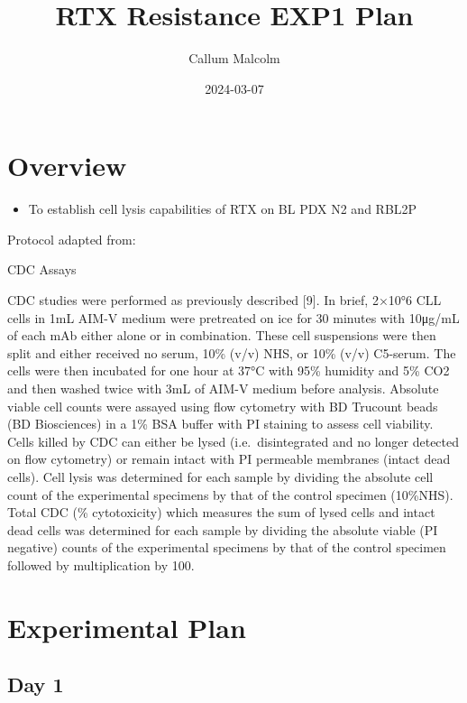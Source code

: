 \documentclass[
]{article}
\title{RTX Resistance EXP1 Plan}
\author{Callum Malcolm}
\date{2024-03-07}
\providecommand{\tightlist}{%
  \setlength{\itemsep}{0pt}\setlength{\parskip}{0pt}}
\begin{document}
\maketitle

\hypertarget{overview}{%
\section{Overview}\label{overview}}

\begin{itemize}
\tightlist
\item
  To establish cell lysis capabilities of RTX on BL PDX N2 and RBL2P
\end{itemize}

Protocol adapted from:

CDC Assays

CDC studies were performed as previously described {[}9{]}. In brief,
2×10°6 CLL cells in 1mL AIM-V medium were pretreated on ice for 30
minutes with 10μg/mL of each mAb either alone or in combination. These
cell suspensions were then split and either received no serum, 10\%
(v/v) NHS, or 10\% (v/v) C5-serum. The cells were then incubated for one
hour at 37°C with 95\% humidity and 5\% CO2 and then washed twice with
3mL of AIM-V medium before analysis. Absolute viable cell counts were
assayed using flow cytometry with BD Trucount beads (BD Biosciences) in
a 1\% BSA buffer with PI staining to assess cell viability. Cells killed
by CDC can either be lysed (i.e.~disintegrated and no longer detected on
flow cytometry) or remain intact with PI permeable membranes (intact
dead cells). Cell lysis was determined for each sample by dividing the
absolute cell count of the experimental specimens by that of the control
specimen (10\%NHS). Total CDC (\% cytotoxicity) which measures the sum
of lysed cells and intact dead cells was determined for each sample by
dividing the absolute viable (PI negative) counts of the experimental
specimens by that of the control specimen followed by multiplication by
100.

\hypertarget{experimental-plan}{%
\section{Experimental Plan}\label{experimental-plan}}

\hypertarget{day-1}{%
\subsection{Day 1}\label{day-1}}
\end{document}
